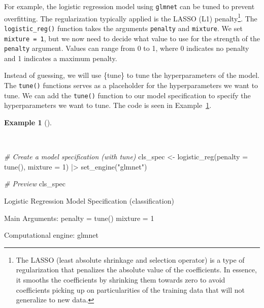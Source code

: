\documentclass[
  letterpaper,
]{book}
\newenvironment{Shaded}{\begin{snugshade}}{\end{snugshade}}
\newcommand{\AttributeTok}[1]{\textcolor[rgb]{0.00,0.00,0.00}{#1}}
\newcommand{\CommentTok}[1]{\textcolor[rgb]{0.00,0.00,0.00}{\textit{#1}}}
\newcommand{\DecValTok}[1]{\textcolor[rgb]{0.00,0.00,0.00}{#1}}
\newcommand{\FunctionTok}[1]{\textcolor[rgb]{0.00,0.00,0.00}{#1}}
\newcommand{\NormalTok}[1]{\textcolor[rgb]{0.00,0.00,0.00}{#1}}
\newcommand{\OtherTok}[1]{\textcolor[rgb]{0.00,0.00,0.00}{#1}}
\newcommand{\SpecialCharTok}[1]{\textcolor[rgb]{0.00,0.00,0.00}{#1}}
\newcommand{\StringTok}[1]{\textcolor[rgb]{0.00,0.00,0.00}{#1}}
\theoremstyle{definition}
\newtheorem{example}{Example}[chapter]
\theoremstyle{remark}
\begin{document}
For example, the logistic regression model using \texttt{glmnet} can be
tuned to prevent overfitting. The regularization typically applied is
the LASSO (L1) penalty\footnote{The LASSO (least absolute shrinkage and
  selection operator) is a type of regularization that penalizes the
  absolute value of the coefficients. In essence, it smooths the
  coefficients by shrinking them towards zero to avoid coefficients
  picking up on particularities of the training data that will not
  generalize to new data.}. The \texttt{logistic\_reg()} function takes
the arguments \texttt{penalty} and \texttt{mixture}. We set
\texttt{mixture\ =\ 1}, but we now need to decide what value to use for
the strength of the \texttt{penalty} argument. Values can range from 0
to 1, where 0 indicates no penalty and 1 indicates a maximum penalty.

Instead of guessing, we will use \{tune\} to tune the hyperparameters of
the model. The \texttt{tune()} functions serves as a placeholder for the
hyperparameters we want to tune. We can add the \texttt{tune()} function
to our model specification to specify the hyperparameters we want to
tune. The code is seen in
Example~\ref{exm-predict-class-model-spec-tune}.

\begin{example}[]\protect\hypertarget{exm-predict-class-model-spec-tune}{}\label{exm-predict-class-model-spec-tune}

~

\begin{Shaded}
\begin{Highlighting}[]
\CommentTok{\# Create a model specification (with tune)}
\NormalTok{cls\_spec }\OtherTok{\textless{}{-}}
  \FunctionTok{logistic\_reg}\NormalTok{(}\AttributeTok{penalty =} \FunctionTok{tune}\NormalTok{(), }\AttributeTok{mixture =} \DecValTok{1}\NormalTok{) }\SpecialCharTok{|\textgreater{}}
  \FunctionTok{set\_engine}\NormalTok{(}\StringTok{"glmnet"}\NormalTok{)}

\CommentTok{\# Preview}
\NormalTok{cls\_spec}
\end{Highlighting}
\end{Shaded}

\begin{Shaded}
\begin{Highlighting}[]
\NormalTok{Logistic Regression Model Specification (classification)}

\NormalTok{Main Arguments:}
\NormalTok{  penalty = tune()}
\NormalTok{  mixture = 1}

\NormalTok{Computational engine: glmnet}
\end{Highlighting}
\end{Shaded}

\end{example}
\end{document}
